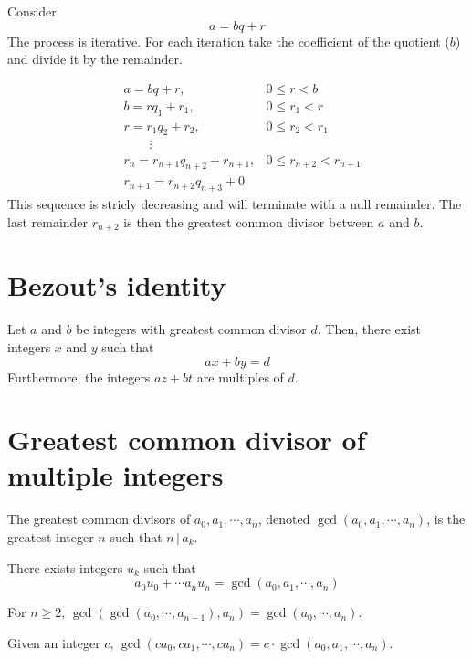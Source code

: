 \documentclass[preview]{standalone}
\newcommand{\divides}{\,|\,}
\begin{document}
Consider
\[
    a = bq + r
\]
The process is iterative.
For each iteration take the coefficient of the quotient (\(b\)) and divide it by the remainder.

\begin{align*}
    &a = bq + r, &0 \leq r < b \\
    &b = rq_1 + r_1, &0 \leq r_1 < r \\
    &r = r_1q_2 + r_2, &0 \leq r_2 < r_1 \\
    \phantom{ } &\qquad \vdots & \\
    &r_n = r_{n+1}q_{n+2} + r_{n+1}, &0 \leq r_{n+2} < r_{n+1} \\
    &r_{n+1} = r_{n+2}q_{n+3} + 0&
\end{align*}
This sequence is stricly decreasing and will terminate with a null remainder.
The last remainder \(r_{n+2}\) is then the greatest common divisor between \(a\) and \(b\).

\section{Bezout's identity}

Let \(a\) and \(b\) be integers with greatest common divisor \(d\).
Then, there exist integers \(x\) and \(y\) such that
\[
    ax+by=d
\]
Furthermore, the integers \(az+bt\) are multiples of \(d\).

\section{Greatest common divisor of multiple integers}

The greatest common divisors of \(a_0, a_1, \cdots, a_n\), denoted \(\gcd(a_0, a_1, \cdots, a_n)\),
is the greatest integer \(n\) such that \(n \divides a_k\).

There exists integers \(u_k\) such that
\[
    a_0u_0 + \cdots a_nu_n = \gcd(a_0, a_1, \cdots, a_n)
\]

For \(n \geq 2\), \(\gcd(\gcd(a_0, \cdots, a_{n-1}), a_n) = \gcd(a_0, \cdots, a_n)\).

Given an integer \(c\), \(\gcd(ca_0, ca_1, \cdots, ca_n) = c \cdot \gcd(a_0, a_1, \cdots, a_n)\).


\end{document}
